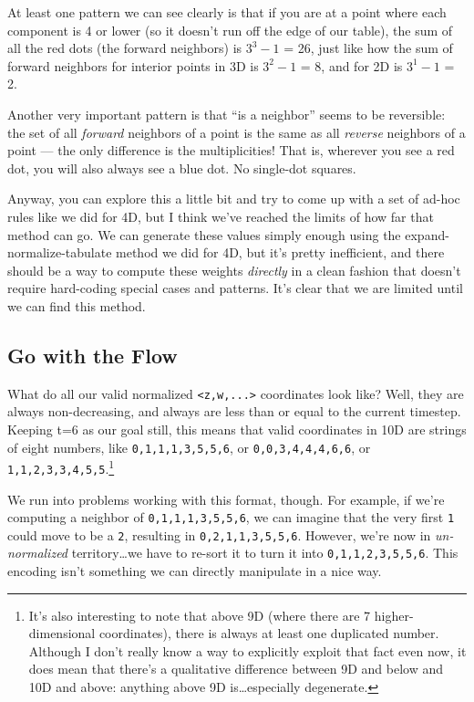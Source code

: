 \documentclass[]{article}
\begin{document}
At least one pattern we can see clearly is that if you are at a point where each
component is 4 or lower (so it doesn't run off the edge of our table), the sum
of all the red dots (the forward neighbors) is \(3^3-1\) = 26, just like how the
sum of forward neighbors for interior points in 3D is \(3^2-1\) = 8, and for 2D
is \(3^1-1\) = 2.

Another very important pattern is that ``is a neighbor'' seems to be reversible:
the set of all \emph{forward} neighbors of a point is the same as all
\emph{reverse} neighbors of a point --- the only difference is the
multiplicities! That is, wherever you see a red dot, you will also always see a
blue dot. No single-dot squares.

Anyway, you can explore this a little bit and try to come up with a set of
ad-hoc rules like we did for 4D, but I think we've reached the limits of how far
that method can go. We can generate these values simply enough using the
expand-normalize-tabulate method we did for 4D, but it's pretty inefficient, and
there should be a way to compute these weights \emph{directly} in a clean
fashion that doesn't require hard-coding special cases and patterns. It's clear
that we are limited until we can find this method.

\hypertarget{go-with-the-flow}{%
\subsection{Go with the Flow}\label{go-with-the-flow}}

What do all our valid normalized \texttt{\textless{}z,w,...\textgreater{}}
coordinates look like? Well, they are always non-decreasing, and always are less
than or equal to the current timestep. Keeping t=6 as our goal still, this means
that valid coordinates in 10D are strings of eight numbers, like
\texttt{0,1,1,1,3,5,5,6}, or \texttt{0,0,3,4,4,4,6,6}, or
\texttt{1,1,2,3,3,4,5,5}.\footnote{It's also interesting to note that above 9D
  (where there are 7 higher-dimensional coordinates), there is always at least
  one duplicated number. Although I don't really know a way to explicitly
  exploit that fact even now, it does mean that there's a qualitative difference
  between 9D and below and 10D and above: anything above 9D is\ldots especially
  degenerate.}

We run into problems working with this format, though. For example, if we're
computing a neighbor of \texttt{0,1,1,1,3,5,5,6}, we can imagine that the very
first \texttt{1} could move to be a \texttt{2}, resulting in
\texttt{0,2,1,1,3,5,5,6}. However, we're now in \emph{un-normalized}
territory\ldots we have to re-sort it to turn it into \texttt{0,1,1,2,3,5,5,6}.
This encoding isn't something we can directly manipulate in a nice way.
\end{document}
